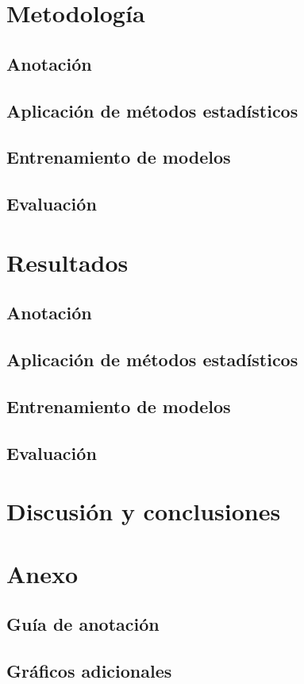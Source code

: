 \documentclass[colorinlistoftodos]{article}
\begin{document}
\section{Metodolog\'ia}
\subsection{Anotación}

\subsection{Aplicación de m\'etodos estad\'isticos}

\subsection{Entrenamiento de modelos}

\subsection{Evaluaci\'on}


\section{Resultados}
\subsection{Anotación}\label{subsec-results-annotation}

\subsection{Aplicación de m\'etodos estad\'isticos}

\subsection{Entrenamiento de modelos}

\subsection{Evaluaci\'on}


\section{Discusi\'on y conclusiones}




\clearpage
\appendix
\section{Anexo}
\subsection{Guía de anotación}\label{appendix-annotation}

\subsection{Gráficos adicionales}\label{appendix-plots}


\listoftodos%
\end{document}
